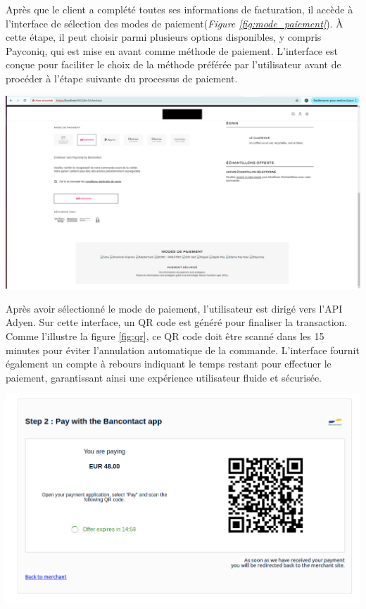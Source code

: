 Après que le client a complété toutes ses informations de facturation, il accède à l'interface de sélection des modes de paiement(\textit{Figure \ref{fig:mode_paiement}}). À cette étape, il peut choisir parmi plusieurs options disponibles, y compris Payconiq, qui est mise en avant comme méthode de paiement. 
L'interface est conçue pour faciliter le choix de la méthode préférée par l'utilisateur avant de procéder à l'étape suivante du processus de paiement.
\begin{center}
    \centering
    \includegraphics[width=19cm]{Figures/Screens/payment.png}
    \label{fig:mode_paiement}
\end{center}
Après avoir sélectionné le mode de paiement, l'utilisateur est dirigé vers l'API Adyen. Sur cette interface, un QR code est généré pour finaliser la transaction. Comme l'illustre la figure \ref{fig:qr}, ce QR code doit être scanné dans les 15 minutes pour éviter l'annulation automatique de la commande. L'interface fournit également un compte à rebours indiquant le temps restant pour effectuer le paiement, garantissant ainsi une expérience utilisateur fluide et sécurisée.
\begin{center}
    \centering
    \includegraphics[width=19cm]{Figures/Screens/redirection.png}
    \label{fig:qr}
\end{center}
